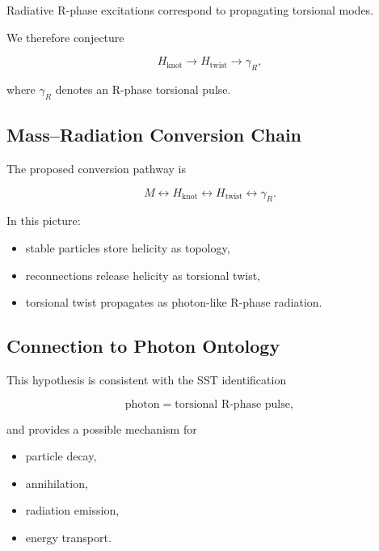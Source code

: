         Radiative R-phase excitations correspond to propagating torsional modes.
        
        We therefore conjecture
        
        \[
            H_{\mathrm{knot}}
            \rightarrow
            H_{\mathrm{twist}}
            \rightarrow
            \gamma_R ,
        \]
        
        where $\gamma_R$ denotes an R-phase torsional pulse.
    
    \subsection{Mass--Radiation Conversion Chain}
        
        The proposed conversion pathway is
        
        \[
            M
            \leftrightarrow
            H_{\mathrm{knot}}
            \leftrightarrow
            H_{\mathrm{twist}}
            \leftrightarrow
            \gamma_R.
        \]
        
        In this picture:
        
        \begin{itemize}
            \item stable particles store helicity as topology,
            \item reconnections release helicity as torsional twist,
            \item torsional twist propagates as photon-like R-phase radiation.
        \end{itemize}
    
    \subsection{Connection to Photon Ontology}
        
        This hypothesis is consistent with the SST identification
        
        \[
            \text{photon}
            =
            \text{torsional R-phase pulse},
        \]
        
        and provides a possible mechanism for
        
        \begin{itemize}
            \item particle decay,
            \item annihilation,
            \item radiation emission,
            \item energy transport.
        \end{itemize}
    
